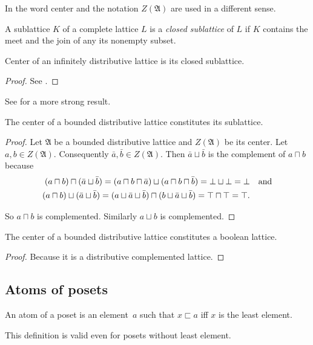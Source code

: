 \begin{rem}
In \cite{ADTCGSBVA} the word center and the notation $Z(\mathfrak{A})$
are used in a different sense.\end{rem}
\begin{defn}
A sublattice $K$ of a complete lattice
$L$ is a \emph{closed sublattice} of $L$ if $K$ contains the meet
and the join of any its nonempty subset.\end{defn}
\begin{thm}
Center of an infinitely distributive lattice is its closed sublattice.\end{thm}
\begin{proof}
See \cite{center-inf-distr}.\end{proof}
\begin{rem}
See \cite{center-complete} for a more strong result.\end{rem}
\begin{thm}
The center of a bounded distributive lattice constitutes its sublattice.\end{thm}
\begin{proof}
Let $\mathfrak{A}$ be a bounded distributive lattice and $Z(\mathfrak{A})$
be its center. Let $a,b\in Z(\mathfrak{A})$. Consequently $\bar{a},\bar{b}\in Z(\mathfrak{A})$.
Then $\bar{a}\sqcup\bar{b}$ is the complement of $a\sqcap b$ because
\begin{align*}
(a\sqcap b)\sqcap(\bar{a}\sqcup\bar{b})=(a\sqcap b\sqcap\bar{a})\sqcup(a\sqcap b\sqcap\bar{b})=\bot\sqcup\bot=\bot & \text{\quad and}\\
(a\sqcap b)\sqcup(\bar{a}\sqcup\bar{b})=(a\sqcup\bar{a}\sqcup\bar{b})\sqcap(b\sqcup{\bar{a}\sqcup\bar{b}})=\top\sqcap\top=\top.
\end{align*}


So $a\sqcap b$ is complemented. Similarly $a\sqcup b$ is complemented.\end{proof}
\begin{thm}
\label{centr-bool}The center of a bounded distributive lattice constitutes
a boolean lattice.\end{thm}
\begin{proof}
Because it is a distributive complemented lattice.
\end{proof}

\subsection{Atoms of posets}
\begin{defn}
An atom of a poset is an element~$a$ such that
$x\sqsubset a$ iff $x$ is the least element.\end{defn}
\begin{rem}
This definition is valid even for posets without least element.
\end{rem}

